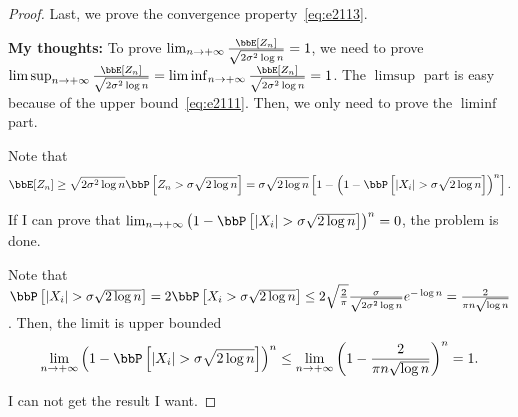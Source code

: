 \documentclass[11pt]{article}
\newcommand{\of}[1]{\left(#1\right)}
\newcommand{\off}[1]{\left[#1\right]}
\theoremstyle{plain}
\theoremstyle{definition}
\begin{document}
\begin{proof}
	 \vspace{0.2cm}
	 Last, we prove the convergence property~\eqref{eq:e2113}.
	 
	\textbf{My thoughts:} To prove $\lim_{n \rightarrow +\infty}\frac{ \bbE[Z_n]}{\sqrt{2\sigma^2 \log n}}  = 1$, we need to prove $\limsup_{n \rightarrow +\infty}\frac{ \bbE[Z_n]}{\sqrt{2\sigma^2 \log n}}  = \liminf_{n \rightarrow +\infty}\frac{ \bbE[Z_n]}{\sqrt{2\sigma^2 \log n}} = 1$. The $\limsup$ part is easy because of the upper bound~\eqref{eq:e2111}. Then, we only need to prove the $\liminf$ part.
	
	Note that 
	\[\bbE[Z_n] \geq \sqrt{2 \sigma^2 \log n}  \bbP \off{Z_n > \sigma \sqrt{2 \log n}} =  \sigma \sqrt{2\log n} \off{1 - \of{1 - \bbP \off{|X_i| > \sigma \sqrt{2\log n}}   }^n}. \]
	
	If I can prove that $\lim_{n \rightarrow +\infty}\of{1 - \bbP \off{|X_i| > \sigma \sqrt{2\log n}}   }^n = 0 $, the problem is done.
	
	Note that $\bbP \off{|X_i| > \sigma \sqrt{2\log n}}  = 2 \bbP \off{X_i > \sigma \sqrt{2\log n}} \leq 2 \sqrt{\frac{2}{\pi}} \frac{\sigma}{\sqrt{2 \sigma^2 \log n}} e^{-\log n} = \frac{2}{\pi n \sqrt{\log n}}$. Then, the limit is upper bounded
	 \[\lim_{n \rightarrow +\infty}\of{1 - \bbP \off{|X_i| > \sigma \sqrt{2\log n}}   }^n \leq \lim_{n \rightarrow +\infty} \of{1 -  \frac{2}{\pi n \sqrt{\log n}} }^n = 1. \]
	 
	 I can not get the result I want.
	 
	 \iffalse
	 By Markov's inequality, the expectation of $Z_n$ satisfies
	 \begin{equation}
	 	\bbE[Z_n] \geq t \bbP[Z_n \geq t],\quad \text{for all }t \geq 0.
	 \end{equation}
	 By the independence of $\{X_i\}_{i=1}^n$, the tail probability of $Z_n$ is
	 \begin{equation}
	 	\bbP[Z_n \geq t] = 1 - (1 - \bbP(|X_1| \geq t))^n.
	 \end{equation}
	 
	 Let $t = \sqrt{2\sigma^2 \log n}$. By equation~\eqref{eq:e211proupper}, the tail probability of $X_1$ satisfies
	 \begin{equation}
	 	\bbP(|X_1| \geq \sqrt{2\sigma^2 \log n}) \leq \frac{2}{\sqrt{ \pi \log n}} \frac{1}{n} \leq \frac{1}{n},\quad \text{for all } n \geq 5.
	 \end{equation}	 
	 Hence, the tail probability of $Z_n$ with $t = \sqrt{2\sigma^2 \log n} $satisfies
	 \begin{equation}
	 	\bbP[Z_n \geq t] \geq 1 - 
	 \end{equation}
	 \fi
\end{proof}
\end{document}
